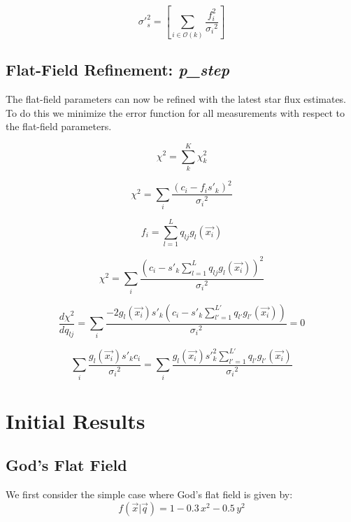 \documentclass[manuscript]{aastex}
\begin{document}
\begin{displaymath}
\sigma'^2_s = \left[{\sum_{i \in \mathcal{O}(k)}  \frac{f_{i}^2}{{\sigma_i}^2}} \right]
\end{displaymath}


\subsection{Flat-Field Refinement: \textbf{\textit{p\_step}}}
The flat-field parameters can now be refined with the latest star flux estimates. To do this we minimize the error function for all measurements with respect to the flat-field parameters.

\begin{displaymath}
\chi^2 = \sum_{k}^{K} \chi^2_k
\end{displaymath}

\begin{displaymath}
\chi^2 = \sum_{i} \frac{(c_i-f_{i}s'_{k})^2}{{\sigma_i}^2}
\end{displaymath}

\begin{displaymath}
f_{i} = \sum_{l = 1}^L q_{lj} g_l(\vec{x_i})
\end{displaymath}

\begin{displaymath}
\chi^2 = \sum_{i} \frac{(c_i- s'_{k} \sum_{l = 1}^L q_{lj} g_l(\vec{x_i}))^2}{{\sigma_i}^2}
\end{displaymath}

\begin{displaymath}
\frac{d\chi^2}{dq_{lj}} = \sum_{i} \frac{-2 g_l(\vec{x_i}) s'_{k} (c_i- s'_{k} \sum_{l' = 1}^{L'} q_{l'} g_{l'}(\vec{x_i}))}{{\sigma_i}^2} = 0
\end{displaymath}

\begin{displaymath}
\sum_{i} \frac{g_l(\vec{x_i}) s'_{k} c_i}{{\sigma_i}^2} = \sum_{i} \frac{g_l (\vec{x_i}) s'^2_{k} \sum_{l' = 1}^{L'} q_{l'} g_{l'} (\vec{x_i})} {{\sigma_i}^2}
\end{displaymath}

\section{Initial Results}

\subsection{God's Flat Field}
We first consider the simple case where God's flat field is given by:
\begin{displaymath}
f(\vec{x} | \vec{q}) = 1 - 0.3\,x^2 - 0.5\,y^2 
\end{displaymath}
\end{document}
